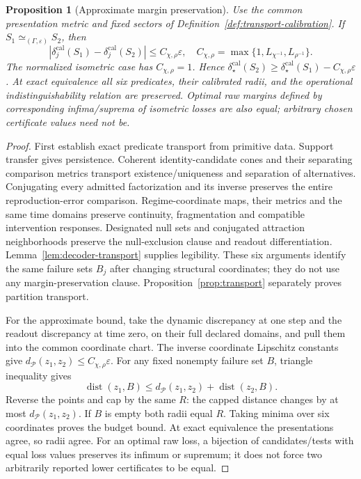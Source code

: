 \documentclass[11pt,a4paper]{article}
\newtheorem{proposition}[theorem]{Proposition}
\theoremstyle{definition}
\newcommand{\eps}{\varepsilon}
\begin{document}
\begin{proposition}[Approximate margin preservation]\label{prop:margins}
Use the common presentation metric and fixed sectors of Definition~\ref{def:transport-calibration}. If $S_1\simeq_{(\Gamma,\eps)}S_2$, then
\[
 |\delta_j^{\mathrm{cal}}(S_1)-\delta_j^{\mathrm{cal}}(S_2)|\le C_{\chi,\rho}\eps,
 \quad C_{\chi,\rho}=\max\{1,L_{\chi^{-1}},L_{\rho^{-1}}\}.
\]
The normalized isometric case has $C_{\chi,\rho}=1$. Hence $\delta_\star^{\mathrm{cal}}(S_2)\ge\delta_\star^{\mathrm{cal}}(S_1)-C_{\chi,\rho}\eps$. At exact equivalence all six predicates, their calibrated radii, and the operational indistinguishability relation are preserved. Optimal raw margins defined by corresponding infima/suprema of isometric losses are also equal; arbitrary chosen certificate values need not be.
\end{proposition}
\begin{proof}
First establish exact predicate transport from primitive data. Support transfer gives persistence. Coherent identity-candidate cones and their separating comparison metrics transport existence/uniqueness and separation of alternatives. Conjugating every admitted factorization and its inverse preserves the entire reproduction-error comparison. Regime-coordinate maps, their metrics and the same time domains preserve continuity, fragmentation and compatible intervention responses. Designated null sets and conjugated attraction neighborhoods preserve the null-exclusion clause and readout differentiation. Lemma~\ref{lem:decoder-transport} supplies legibility. These six arguments identify the same failure sets $B_j$ after changing structural coordinates; they do not use any margin-preservation clause. Proposition~\ref{prop:transport} separately proves partition transport.

For the approximate bound, take the dynamic discrepancy at one step and the readout discrepancy at time zero, on their full declared domains, and pull them into the common coordinate chart. The inverse coordinate Lipschitz constants give $d_{\mathcal P}(z_1,z_2)\le C_{\chi,\rho}\eps$. For any fixed nonempty failure set $B$, triangle inequality gives
\[
 \operatorname{dist}(z_1,B)\le d_{\mathcal P}(z_1,z_2)+\operatorname{dist}(z_2,B).
\]
Reverse the points and cap by the same $R$: the capped distance changes by at most $d_{\mathcal P}(z_1,z_2)$. If $B$ is empty both radii equal $R$. Taking minima over six coordinates proves the budget bound. At exact equivalence the presentations agree, so radii agree. For an optimal raw loss, a bijection of candidates/tests with equal loss values preserves its infimum or supremum; it does not force two arbitrarily reported lower certificates to be equal.
\end{proof}
\end{document}
